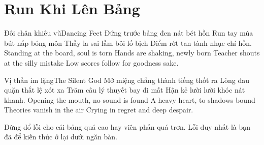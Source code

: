 \chapter{Run Khi Lên Bảng}

\begin{tutuyetbox}{Đôi chân khiêu vũ}{Dancing Feet}
Đứng trước bảng đen nát bét hồn
Run tay múa bút nấp bóng môn
Thầy la sai lầm bôi lố bịch
Điểm rớt tan tành nhục chí hồn.
\tcblower
Standing at the board, soul is torn 
Hands are shaking, newly born 
Teacher shouts at the silly mistake 
Low scores follow for goodness sake.
\end{tutuyetbox}

\begin{tutuyetbox}{Vị thần im lặng}{The Silent God}
Mở miệng chẳng thành tiếng thốt ra
Lòng đau quặn thắt lệ xót xa
Trăm câu lý thuyết bay đi mất
Hận kẻ lười lười khóc nát khanh.
\tcblower
Opening the mouth, no sound is found 
A heavy heart, to shadows bound 
Theories vanish in the air 
Crying in regret and deep despair.
\end{tutuyetbox}

\begin{ghichu}
Đừng đổ lỗi cho cái bảng quá cao hay viên phấn quá trơn. Lỗi duy nhất là bạn đã để kiến thức ở lại dưới ngăn bàn.
\end{ghichu}
